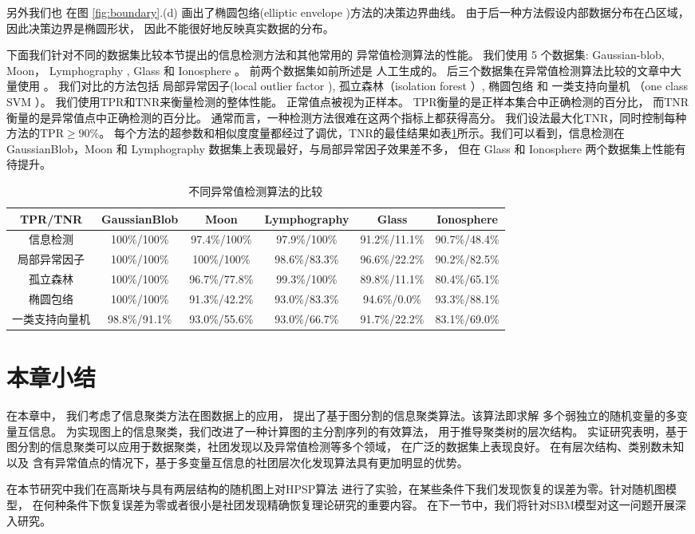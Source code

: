 另外我们也
在图 \ref{fig:boundary}.(d) 画出了椭圆包络(elliptic envelope \citep{rousseeuw1999fast} )方法的决策边界曲线。
由于后一种方法假设内部数据分布在凸区域，因此决策边界是椭圆形状，
因此不能很好地反映真实数据的分布。

下面我们针对不同的数据集比较本节提出的信息检测方法和其他常用的
异常值检测算法的性能。
我们使用 5 个数据集: Gaussian-blob, Moon， Lymphography
\cite{lazarevic2005feature}, Glass 和 Ionosphere \cite{keller2012hics}。 
前两个数据集如前所述是
人工生成的。
后三个数据集在异常值检测算法比较的文章中大量使用
\cite{campos2016evaluation}。
我们对比的方法包括
局部异常因子(local outlier factor \citep{Breunig}), 孤立森林（isolation forest \citep{if}）, 
椭圆包络  和
一类支持向量机 （one class SVM \citep{svm}）。 
我们使用TPR和TNR来衡量检测的整体性能。
正常值点被视为正样本。
TPR衡量的是正样本集合中正确检测的百分比，
而TNR衡量的是异常值点中正确检测的百分比。
通常而言，一种检测方法很难在这两个指标上都获得高分。
我们设法最大化TNR，同时控制每种方法的TPR$\geq 90\%$。
每个方法的超参数和相似度度量都经过了调优，TNR的最佳结果如表\ref{tab:odm}所示。我们可以看到，信息检测在 GaussianBlob，Moon 和
Lymphography 数据集上表现最好，与局部异常因子效果差不多，
但在 Glass 和  Ionosphere 两个数据集上性能有待提升。
\begin{table}
  \begin{adjustbox}{width=\columnwidth,center}
\begin{tabular}{cccccc}
  \hline
         TPR/TNR        &  GaussianBlob   &      Moon       &  Lymphography  &     Glass     &  Ionosphere   \\
  \hline
      信息检测    & 100\%/100\% & 97.4\%/100\%  & 97.9\%/100\% & 91.2\%/11.1\% & 90.7\%/48.4\% \\
      局部异常因子 & 100\%/100\% & 100\%/100\% & 98.6\%/83.3\%  & 96.6\%/22.2\% & 90.2\%/82.5\% \\
   孤立森林   & 100\%/100\% &  96.7\%/77.8\%  & 99.3\%/100\% & 89.8\%/11.1\% & 80.4\%/65.1\% \\
    椭圆包络   & 100\%/100\% &  91.3\%/42.2\%  & 93.0\%/83.3\%  & 94.6\%/0.0\%  & 93.3\%/88.1\% \\
     一类支持向量机     &  98.8\%/91.1\%  &  93.0\%/55.6\%  & 93.0\%/66.7\%  & 91.7\%/22.2\% & 83.1\%/69.0\% \\
  \hline
  \end{tabular}
\end{adjustbox}
\caption{不同异常值检测算法的比较}\label{tab:odm}
\end{table}

\section{本章小结}
在本章中，
我们考虑了信息聚类方法在图数据上的应用，
提出了基于图分割的信息聚类算法。该算法即求解
多个弱独立的随机变量的多变量互信息。
为实现图上的信息聚类，我们改进了一种计算图的主分割序列的有效算法，
用于推导聚类树的层次结构。
实证研究表明，基于图分割的信息聚类可以应用于数据聚类，社团发现以及异常值检测等多个领域，
在广泛的数据集上表现良好。
在有层次结构、类别数未知以及
含有异常值点的情况下，基于多变量互信息的社团层次化发现算法具有更加明显的优势。

在本节研究中我们在高斯块与具有两层结构的随机图上对HPSP算法
进行了实验，在某些条件下我们发现恢复的误差为零。针对随机图模型，
在何种条件下恢复误差为零或者很小是社团发现精确恢复理论研究的重要内容。
在下一节中，我们将针对SBM模型对这一问题开展深入研究。
